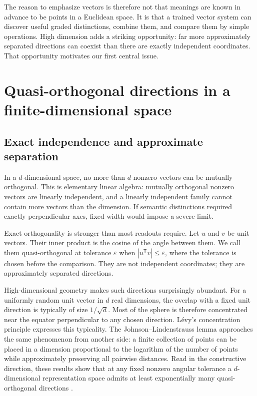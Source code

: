 \documentclass[
  aps,
  reprint,
  superscriptaddress,
  floatfix,
  nofootinbib,
  longbibliography
]{revtex4-2}
\newcommand{\T}{^{\mathsf T}}
\begin{document}
The reason to emphasize vectors is therefore not that meanings are known in
advance to be points in a Euclidean space.  It is that a trained vector system
can discover useful graded distinctions, combine them, and compare them by
simple operations.  High dimension adds a striking opportunity: far more
approximately separated directions can coexist than there are exactly
independent coordinates.  That opportunity motivates our first central
issue.

\section{Quasi-orthogonal directions in a finite-dimensional space}
\label{sec:quasi}

\subsection{Exact independence and approximate separation}

In a $d$-dimensional space, no more than $d$ nonzero vectors can be mutually
orthogonal.  This is elementary linear algebra: mutually orthogonal nonzero
vectors are linearly independent, and a linearly independent family cannot
contain more vectors than the dimension.  If semantic distinctions required
exactly perpendicular axes, fixed width would impose a severe limit.

Exact orthogonality is stronger than most readouts require.  Let $u$ and $v$
be unit vectors.  Their inner product is the cosine of the angle between them.
We call them quasi-orthogonal at tolerance $\varepsilon$ when
$|u\T v|\leq\varepsilon$, where the tolerance is chosen before the comparison.
They are not independent coordinates; they are approximately separated
directions.

High-dimensional geometry makes such directions surprisingly abundant.
For a uniformly random unit vector in $d$ real dimensions, the overlap with a
fixed unit direction is typically of size $1/\sqrt d$.  Most of the sphere is
therefore concentrated near the equator perpendicular to any chosen
direction.  L\'evy's concentration principle expresses this typicality.
The Johnson--Lindenstrauss lemma approaches the same phenomenon from another
side: a finite collection of points can be placed in a dimension proportional
to the logarithm of the number of points while approximately preserving all
pairwise distances.  Read in the constructive direction, these results show
that at any fixed nonzero angular tolerance a $d$-dimensional representation
space admits
at least exponentially many quasi-orthogonal directions
\cite{ledoux2001concentration,johnson-1984,Dasgupta-2003}.
\end{document}
